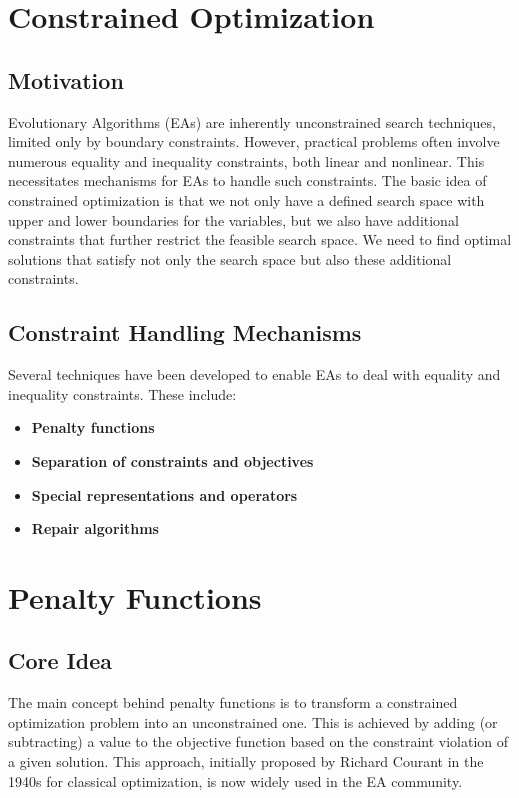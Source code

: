 \section{Constrained Optimization}

\subsection*{Motivation}

Evolutionary Algorithms (EAs) are inherently unconstrained search techniques, limited only by boundary constraints.  However, practical problems often involve numerous equality and inequality constraints, both linear and nonlinear.  This necessitates mechanisms for EAs to handle such constraints. The basic idea of constrained optimization is that we not only have a defined search space with upper and lower boundaries for the variables, but we also have additional constraints that further restrict the feasible search space. We need to find optimal solutions that satisfy not only the search space but also these additional constraints.

\subsection*{Constraint Handling Mechanisms}

Several techniques have been developed to enable EAs to deal with equality and inequality constraints. These include:

\begin{itemize}
    \item \textbf{Penalty functions}
    \item \textbf{Separation of constraints and objectives}
    \item \textbf{Special representations and operators}
    \item \textbf{Repair algorithms}
\end{itemize}

\section{Penalty Functions}

\subsection*{Core Idea}

The main concept behind penalty functions is to transform a constrained optimization problem into an unconstrained one.  This is achieved by adding (or subtracting) a value to the objective function based on the constraint violation of a given solution.  This approach, initially proposed by Richard Courant in the 1940s for classical optimization, is now widely used in the EA community.

